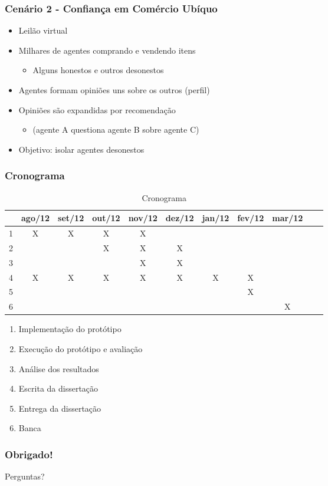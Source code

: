 \documentclass[14pt]{beamer}
\begin{document}

\begin{frame}
	\frametitle{Cenário 2 - Confiança em Comércio Ubíquo}
	\begin{itemize}
		\item Leilão virtual
		\item Milhares de agentes comprando e vendendo itens
		\begin{itemize}
			\item Alguns honestos e outros desonestos
		\end{itemize}
		\item Agentes formam opiniões uns sobre os outros (perfil)
		\item Opiniões são expandidas por recomendação
		\begin{itemize}
			\item (agente A questiona agente B sobre agente C)
		\end{itemize}
		\item Objetivo: isolar agentes desonestos
	\end{itemize}
\end{frame}


\begin{frame}
  \frametitle{Cronograma}
\begin{table}\centering\scriptsize
  \begin{tabular*}{1\textwidth}{@{}ccccccccccc@{}}
    \toprule
    & ago/12 & set/12 & out/12 & nov/12 & dez/12 & jan/12 & fev/12 & mar/12 \\
    \midrule
    1 & X & X & X & X &   &   &   &   \\
    2 &   &   & X & X & X &   &   &   \\
    3 &   &   &   & X & X &   &   &   \\
    4 & X & X & X & X & X & X & X &   \\
    5 &   &   &   &   &   &   & X &   \\
    6 &   &   &   &   &   &   &   & X \\
    \bottomrule
  \end{tabular*}
  \caption{Cronograma}
  \label{tab:cronograma}
\end{table}

\begin{enumerate}

\scriptsize
\item Implementação do protótipo
\item Execução do protótipo e avaliação
\item Análise dos resultados
\item Escrita da dissertação
\item Entrega da dissertação
\item Banca

\end{enumerate}

\end{frame}


\begin{frame}
  \frametitle{Obrigado!}
  Perguntas?
\end{frame}
\end{document}
